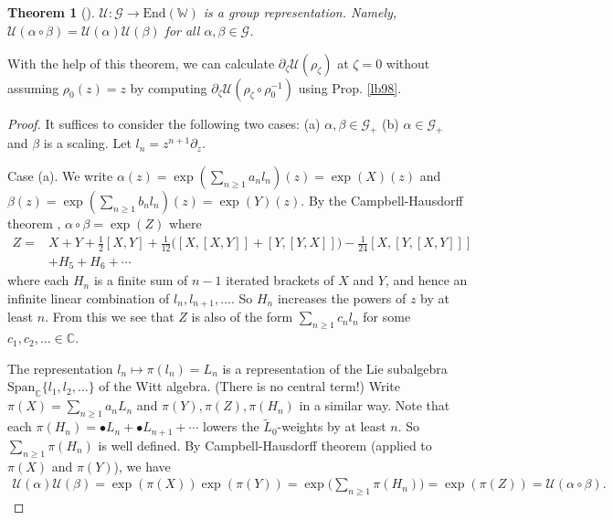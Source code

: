 \documentclass[12pt,a4paper,notitlepage]{article}
\theoremstyle{definition}
\theoremstyle{plain}
\newtheorem{thm}[df]{Theorem}
\newcommand{\mc}{\mathcal}
\newcommand{\wtd}{\widetilde}
\newcommand{\End}{\mathrm{End}} %
\newcommand{\Span}{\mathrm{Span}}
\newcommand{\blt}{\bullet}
\newcommand{\Wbb}{\mathbb W}
\newcommand{\Cbb}{\mathbb C}
\numberwithin{equation}{section}
\begin{document}
\subsection{}



\begin{thm}[{\cite[Sec. 4.2]{Hua97}}]\label{lb100}
$\mc U:\mc G\rightarrow\End(\Wbb)$ is a group representation. Namely, $\mc U(\alpha\circ\beta)=\mc U(\alpha)\mc U(\beta)$ for all $\alpha,\beta\in\mc G$.
\end{thm}

With the help of this theorem, we can calculate $\partial_\zeta\mc U(\rho_\zeta)$ at $\zeta=0$ without assuming $\rho_0(z)=z$ by computing $\partial_\zeta\mc U(\rho_\zeta\circ\rho^{-1}_0)$ using Prop. \ref{lb98}.

\begin{proof}
It suffices to consider the following two cases: (a) $\alpha,\beta\in\mc G_+$ (b) $\alpha\in\mc G_+$ and $\beta$ is a scaling. Let $l_n=z^{n+1}\partial_z$.


Case (a). We write $\alpha(z)=\exp(\sum_{n\geq 1} a_nl_n)(z)=\exp(X)(z)$ and $\beta(z)=\exp(\sum_{n\geq 1} b_nl_n)(z)=\exp(Y)(z)$. By the Campbell-Hausdorff theorem \cite[Sec. V.5]{Jac}, $\alpha\circ\beta=\exp(Z)$ where
\begin{align*}
Z=&X+Y+\frac 12[X,Y]+\frac 1{12}\big([X,[X,Y]]+[Y,[Y,X]]\big)-\frac 1{24}[X,[Y,[X,Y]]]\\
&+H_5+H_6+\cdots
\end{align*}
where each $H_n$ is a finite sum of $n-1$ iterated brackets of $X$ and $Y$, and hence an infinite linear combination of $l_n,l_{n+1},\dots$. So $H_n$ increases the powers of $z$ by at least $n$. From this we see that $Z$ is also of the form $\sum_{n\geq 1}c_nl_n$ for some $c_1,c_2,\dots\in\Cbb$.

The representation $l_n\mapsto \pi(l_n)=L_n$  is a representation of the Lie subalgebra $\Span_\Cbb\{l_1,l_2,\dots\}$ of the Witt algebra. (There is no central term!) Write $\pi(X)=\sum_{n\geq 1}a_nL_n$ and $\pi(Y),\pi(Z),\pi(H_n)$ in a similar way. Note that each $\pi(H_n)=\blt L_n+\blt L_{n+1}+\cdots$ lowers the $\wtd L_0$-weights by at least $n$. So $\sum_{n\geq 1}\pi(H_n)$ is well defined.  By Campbell-Hausdorff theorem (applied to $\pi(X)$ and $\pi(Y)$), we have
\begin{align*}
\mc U(\alpha)\mc U(\beta)=\exp(\pi(X))\exp(\pi(Y))=\exp\Big(\sum_{n\geq 1}\pi(H_n)\Big)	=\exp(\pi(Z))=\mc U(\alpha\circ\beta).
\end{align*}



\end{proof}
\end{document}

